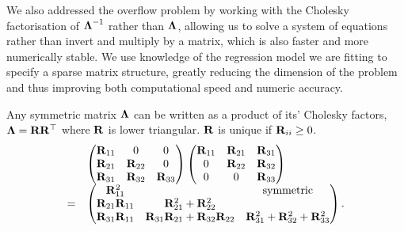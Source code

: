 We also addressed the overflow problem by working with the Cholesky factorisation of ${\boldsymbol \Lambda}^{-1}$
rather than ${\boldsymbol \Lambda}$, allowing us to solve a system of equations rather than invert and multiply by a
matrix, which is also faster and more numerically stable. We use knowledge of the regression  model we are
fitting to specify a sparse matrix structure, greatly reducing the dimension of   the problem and thus
improving both computational speed and numeric accuracy.

	
Any symmetric matrix ${\boldsymbol \Lambda}$ can be written as a product of its' Cholesky factors, ${\boldsymbol \Lambda} = {\bf R}
{\bf R}^\top$ where ${\bf R}$ is lower triangular. ${\bf R}$ is unique if ${\bf R}_{ii}
\geq 0$.
\begin{equation*}
\label{eq:cholesky_factorisation}
\begin{array}{lll}
	&\begin{pmatrix}
	{\bf R}_{11}          & 0                                    & 0                                     \\
	{\bf R}_{21}          & {\bf R}_{22}                             & 0                                     \\
	{\bf R}_{31}          & {\bf R}_{32}                             & {\bf R}_{33}                              
	\end{pmatrix}
	\begin{pmatrix}
	{\bf R}_{11}          & {\bf R}_{21}                             & {\bf R}_{31}                              \\
	0                 & {\bf R}_{22}                             & {\bf R}_{32}                              \\
	0                 & 0                                    & {\bf R}_{33}                              
	\end{pmatrix}
	\\
	=& \begin{pmatrix}
	{\bf R}_{11}^2        &                                      & \text{symmetric}                      \\
	{\bf R}_{21}{\bf R}_{11} & {\bf R}_{21}^2 + {\bf R}_{22}^2 \\
	{\bf R}_{31} {\bf R}_{11} & {\bf R}_{31}{\bf R}_{21} + {\bf R}_{32} {\bf R}_{22} & {\bf R}_{31}^2 + {\bf R}_{32} ^2 + {\bf R}_{33}^2 
	\end{pmatrix}.
\end{array}
\end{equation*}

